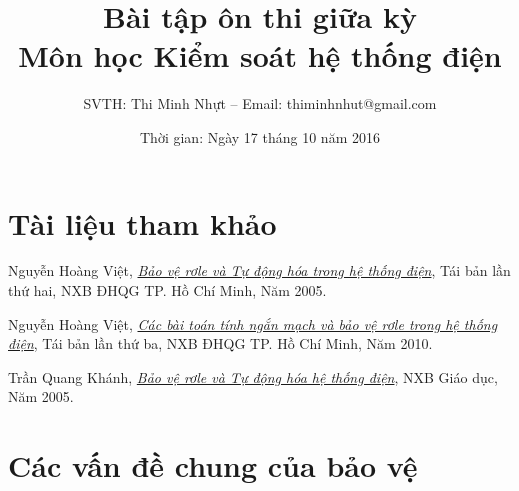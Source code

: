 \documentclass[12pt,a4paper]{article}
\title{\textbf{Bài tập ôn thi giữa kỳ\vspace{.4cm}\\Môn học Kiểm soát hệ thống điện}}
\author{SVTH: Thi Minh Nhựt -- Email: thiminhnhut@gmail.com}
\date{Thời gian: Ngày 17 tháng 10 năm 2016}
\begin{document}
\maketitle
\everymath{\displaystyle}
\tableofcontents
\section*{Tài liệu tham khảo}
\begin{enumerate}[{[1].}]
	\item Nguyễn Hoàng Việt, \href{https://github.com/h3int2um/hethongdien/blob/master/tailieu-hethongdien/NguyenHoangViet_BaoVeRelay_TuDongHoa_HeThongDien_NXB_DHQGHCM_N2005_TBL2_492T.pdf}{\emph{Bảo vệ rơle và Tự động hóa trong hệ thống điện}}, Tái bản lần thứ hai, NXB ĐHQG TP. Hồ Chí Minh, Năm 2005.
		
	\item Nguyễn Hoàng Việt, \href{https://github.com/h3int2um/hethongdien/blob/master/tailieu-hethongdien/NguyenHoangViet_CacBaiToan_TinhNganMach_BaoVeRelay_HeThongDien_NXB_DHQGHCM_N2010_TBL3_400T.pdf}{\emph{Các bài toán tính ngắn mạch và bảo vệ rơle trong hệ thống điện}}, Tái bản lần thứ ba, NXB ĐHQG TP. Hồ Chí Minh, Năm 2010.
	
	\item Trần Quang Khánh, \href{https://github.com/h3int2um/hethongdien/blob/master/tailieu-hethongdien/TranQuangKhanh_BaoVeRelay_TuDongHoa_HeThongDien_NXB_GD_N2005_329T.pdf}{\emph{Bảo vệ rơle và Tự động hóa hệ thống điện}}, NXB Giáo dục, Năm 2005.	
\end{enumerate}
\newpage
{}

\newcommand{\unit}[1]{~#1} %
\newcommand{\unitp}[1]{~\left({#1}\right)} %
\newcommand{\pfm}[1]{\left({#1}\right)} %
\newcommand{\chiso}[2]{\text{\textit{#1}}_{#2}}
\newcommand{\viet}[2]{#1_{\text{\textit{#2}}}}
\renewcommand{\arraystretch}{1.3}
\newpage
\section{Các vấn đề chung của bảo vệ}
\end{document}
